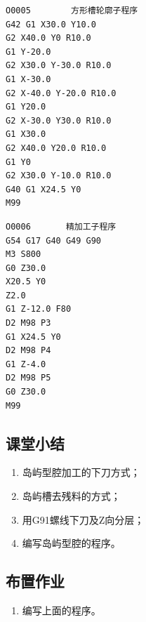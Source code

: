 \begin{lstlisting}
O0005        方形槽轮廓子程序
G42 G1 X30.0 Y10.0
G2 X40.0 Y0 R10.0
G1 Y-20.0 
G2 X30.0 Y-30.0 R10.0
G1 X-30.0 
G2 X-40.0 Y-20.0 R10.0
G1 Y20.0 
G2 X-30.0 Y30.0 R10.0
G1 X30.0 
G2 X40.0 Y20.0 R10.0
G1 Y0 
G2 X30.0 Y-10.0 R10.0
G40 G1 X24.5 Y0
M99
\end{lstlisting}

\begin{lstlisting}
O0006       精加工子程序
G54 G17 G40 G49 G90 
M3 S800
G0 Z30.0
X20.5 Y0
Z2.0
G1 Z-12.0 F80
D2 M98 P3
G1 X24.5 Y0
D2 M98 P4
G1 Z-4.0
D2 M98 P5
G0 Z30.0
M99
\end{lstlisting}



\subsection{课堂小结}
\begin{enumerate}[1、]
\item 岛屿型腔加工的下刀方式；
\item 岛屿槽去残料的方式；
\item 用G91螺线下刀及Z向分层；
\item 编写岛屿型腔的程序。
\end{enumerate}

\vfill
\subsection{布置作业}
\begin{enumerate}[1、]
	\item 编写上面的程序。
\end{enumerate}
\vfill
